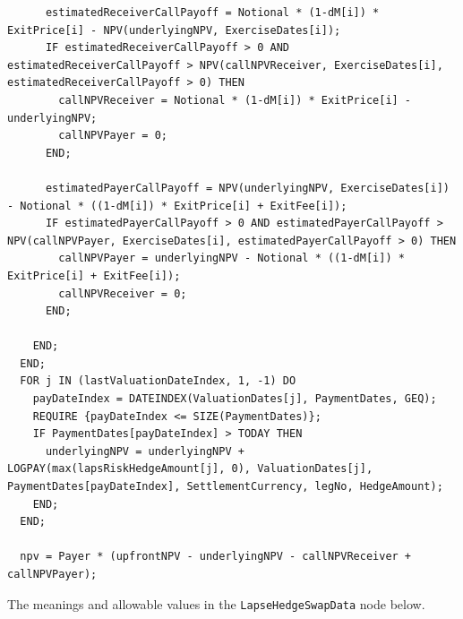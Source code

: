 \begin{listing}[hbt]
\begin{verbatim}
      estimatedReceiverCallPayoff = Notional * (1-dM[i]) * ExitPrice[i] - NPV(underlyingNPV, ExerciseDates[i]);
      IF estimatedReceiverCallPayoff > 0 AND estimatedReceiverCallPayoff > NPV(callNPVReceiver, ExerciseDates[i], estimatedReceiverCallPayoff > 0) THEN
        callNPVReceiver = Notional * (1-dM[i]) * ExitPrice[i] - underlyingNPV;
        callNPVPayer = 0;
      END;

      estimatedPayerCallPayoff = NPV(underlyingNPV, ExerciseDates[i]) - Notional * ((1-dM[i]) * ExitPrice[i] + ExitFee[i]);
      IF estimatedPayerCallPayoff > 0 AND estimatedPayerCallPayoff > NPV(callNPVPayer, ExerciseDates[i], estimatedPayerCallPayoff > 0) THEN
        callNPVPayer = underlyingNPV - Notional * ((1-dM[i]) * ExitPrice[i] + ExitFee[i]);
        callNPVReceiver = 0;
      END;

    END;
  END;
  FOR j IN (lastValuationDateIndex, 1, -1) DO
    payDateIndex = DATEINDEX(ValuationDates[j], PaymentDates, GEQ);
    REQUIRE {payDateIndex <= SIZE(PaymentDates)};
    IF PaymentDates[payDateIndex] > TODAY THEN
      underlyingNPV = underlyingNPV + LOGPAY(max(lapsRiskHedgeAmount[j], 0), ValuationDates[j], PaymentDates[payDateIndex], SettlementCurrency, legNo, HedgeAmount);
    END;
  END;

  npv = Payer * (upfrontNPV - underlyingNPV - callNPVReceiver + callNPVPayer);
\end{verbatim}
\caption{Payoff script for a Lapse Risk Hedge Swap.}
\label{lst:lapse_risk_hedge_swap}
\end{listing}

The meanings and allowable values in the \lstinline!LapseHedgeSwapData! node below.

